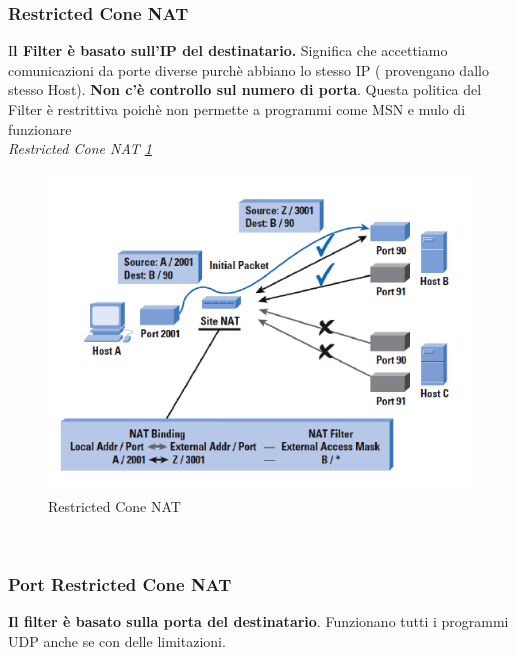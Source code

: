 \documentclass[12pt]{article}
\begin{document}
			 \subsubsection{Restricted Cone NAT}
			 	I\textbf{l Filter è basato sull'IP del destinatario.} Significa che accettiamo comunicazioni da porte diverse purchè abbiano lo stesso IP ( provengano dallo stesso Host). \textbf{Non c'è controllo sul numero di porta}. Questa politica del Filter è restrittiva poichè non permette a programmi come MSN e mulo di funzionare\\
			 	
			 	\textit{Restricted Cone NAT \ref{fig:10}}\\
			 	\begin{figure}[h!]
			 		\centering
			 		\includegraphics[scale=0.60]{img/res.PNG}
			 		\caption{Restricted Cone NAT \label{fig:10}}
			 	\end{figure}\\
			 	
			 \subsubsection{Port Restricted Cone NAT}
			 	\textbf{Il filter è basato sulla porta del destinatario}. Funzionano tutti i programmi UDP anche se con delle limitazioni.\\
			 	
\end{document}
